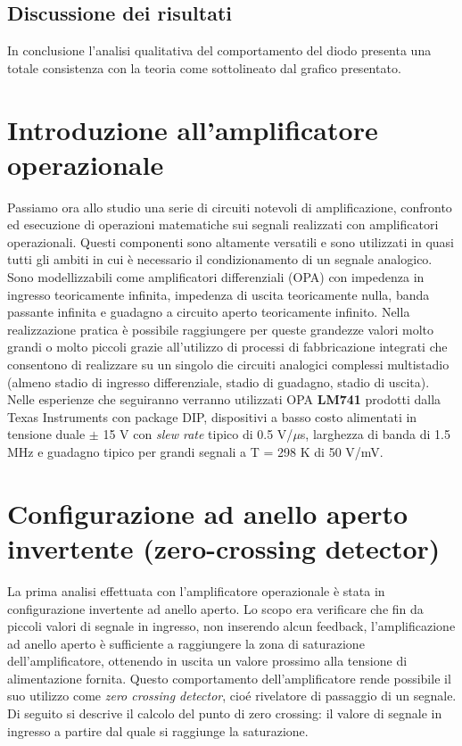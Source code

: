 \documentclass[journal]{IEEEtran}
\begin{document}
\subsection{\textbf{Discussione dei risultati}}
In conclusione l'analisi qualitativa del comportamento del diodo presenta una totale consistenza con la teoria come sottolineato dal grafico presentato.


\section{\textbf{Introduzione all'amplificatore operazionale}}
Passiamo ora allo studio una serie di circuiti notevoli di amplificazione, confronto ed esecuzione di operazioni matematiche sui segnali realizzati con amplificatori operazionali. Questi componenti sono altamente versatili e sono utilizzati in quasi tutti gli ambiti in cui è necessario il condizionamento di un segnale analogico. Sono modellizzabili come amplificatori differenziali (OPA) con impedenza in ingresso teoricamente infinita, impedenza di uscita teoricamente nulla, banda passante infinita e guadagno a circuito aperto teoricamente infinito. Nella realizzazione pratica è possibile raggiungere per queste grandezze valori molto grandi o molto piccoli grazie all'utilizzo di processi di fabbricazione integrati che consentono di realizzare su un singolo die circuiti analogici complessi multistadio (almeno stadio di ingresso differenziale, stadio di guadagno, stadio di uscita). Nelle esperienze che seguiranno verranno utilizzati OPA \textbf{LM741} prodotti dalla Texas Instruments con package DIP, dispositivi a basso costo alimentati in tensione duale $\pm$ 15 V con \textit{slew rate} tipico di 0.5 V/$\mu$s, larghezza di banda di 1.5 MHz e guadagno tipico per grandi segnali a T = 298 K di 50 V/mV. \cite{H}

\section{\textbf{Configurazione ad anello aperto invertente (zero-crossing detector)}} %

La prima analisi effettuata con l'amplificatore operazionale è stata in configurazione invertente ad anello aperto. Lo scopo era verificare che fin da piccoli valori di segnale in ingresso, non inserendo alcun feedback, l'amplificazione ad anello aperto è sufficiente a raggiungere la zona di saturazione dell'amplificatore, ottenendo in uscita un valore prossimo alla tensione di alimentazione fornita.
Questo comportamento dell'amplificatore rende possibile il suo utilizzo come \textit{zero crossing detector}, cioé rivelatore di passaggio di un segnale.
Di seguito si descrive il calcolo del punto di zero crossing: il valore di segnale in ingresso a partire dal quale si raggiunge la saturazione.
\end{document}

